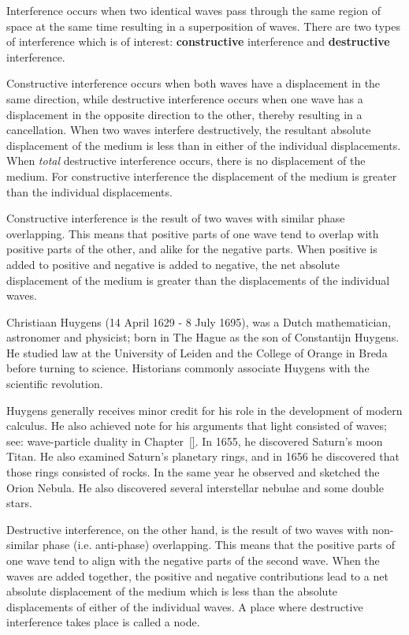 Interference occurs when two identical waves pass through the same region of space at the same time resulting in a superposition of waves. There are two types of interference which is of interest: \textbf{constructive} interference and \textbf{destructive} interference. 

Constructive interference occurs when both waves have a displacement in the same direction, while destructive interference occurs when one wave has a displacement in the opposite direction to the other, thereby resulting in a cancellation. When two waves interfere destructively, the resultant absolute displacement of the medium is less than in either of the individual displacements. When \textit{total} destructive interference occurs, there is no displacement of the medium. For constructive interference the displacement of the medium is greater than the individual displacements. 

Constructive interference is the result of two waves with similar phase overlapping. This means that positive parts of one wave tend to overlap with positive parts of the other, and alike for the negative parts. When positive is added to positive and negative is added to negative, the net absolute displacement of the medium is greater than the displacements of the individual waves.

\begin{IFact}
{Christiaan Huygens (14 April 1629 - 8 July 1695), was a Dutch mathematician, astronomer and physicist; born in The Hague as the son of Constantijn Huygens. He studied law at the University of Leiden and the College of Orange in Breda before turning to science. Historians commonly associate Huygens with the scientific revolution.

Huygens generally receives minor credit for his role in the development of modern calculus. He also achieved note for his arguments that light consisted of waves; see: wave-particle duality in Chapter~\ref{}. In 1655, he discovered Saturn's moon Titan. He also examined Saturn's planetary rings, and in 1656 he discovered that those rings consisted of rocks. In the same year he observed and sketched the Orion Nebula. He also discovered several interstellar nebulae and some double stars.}
\end{IFact}
Destructive interference, on the other hand, is the result of two waves with non-similar phase (i.e. anti-phase) overlapping. This means that the positive parts of one wave tend to align with the negative parts of the second wave. When the waves are added together, the positive and negative contributions lead to a net absolute displacement of the medium which is less than the absolute displacements of either of the individual waves. A place where destructive interference takes place is called a node.

